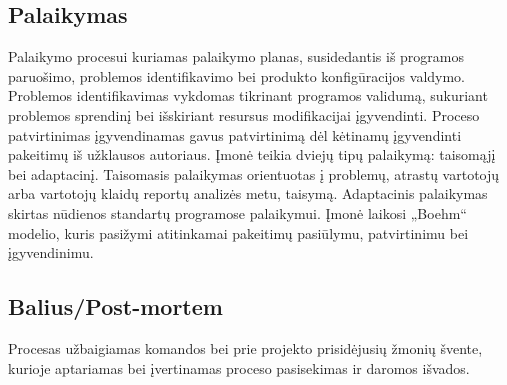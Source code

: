 \documentclass{VUMIFPSkursinis}
\begin{document}
	\subsection{Palaikymas}
	Palaikymo procesui kuriamas palaikymo planas, susidedantis iš programos paruošimo, problemos identifikavimo bei produkto konfigūracijos valdymo. Problemos identifikavimas vykdomas tikrinant programos validumą, sukuriant problemos sprendinį bei išskiriant resursus modifikacijai įgyvendinti. Proceso patvirtinimas įgyvendinamas gavus patvirtinimą dėl kėtinamų įgyvendinti pakeitimų  iš užklausos autoriaus. Įmonė teikia dviejų tipų palaikymą: taisomąjį bei adaptacinį. Taisomasis palaikymas orientuotas į problemų, atrastų vartotojų arba vartotojų klaidų reportų analizės metu, taisymą. Adaptacinis palaikymas skirtas nūdienos standartų programose palaikymui. Įmonė laikosi „Boehm“ modelio, kuris pasižymi atitinkamai pakeitimų pasiūlymu, patvirtinimu bei įgyvendinimu.
	\label{img:boehmsModel} 

	\subsection{Balius/Post-mortem}
	Procesas užbaigiamas komandos bei prie projekto prisidėjusių žmonių švente, kurioje aptariamas bei įvertinamas proceso pasisekimas ir daromos išvados.

\end{document}
